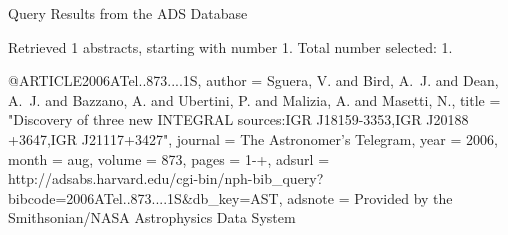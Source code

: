 Query Results from the ADS Database


Retrieved 1 abstracts, starting with number 1.  Total number selected: 1.

@ARTICLE{2006ATel..873....1S,
   author = {{Sguera}, V. and {Bird}, A.~J. and {Dean}, A.~J. and {Bazzano}, A. and 
	{Ubertini}, P. and {Malizia}, A. and {Masetti}, N.},
    title = "{Discovery of three new INTEGRAL sources:IGR J18159-3353,IGR J20188 +3647,IGR J21117+3427}",
  journal = {The Astronomer's Telegram},
     year = 2006,
    month = aug,
   volume = 873,
    pages = {1-+},
   adsurl = {http://adsabs.harvard.edu/cgi-bin/nph-bib_query?bibcode=2006ATel..873....1S&db_key=AST},
  adsnote = {Provided by the Smithsonian/NASA Astrophysics Data System}
}


